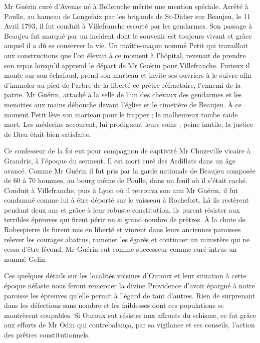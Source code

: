 Mr Guérin curé d'Avenas né à Belleroche mérite une mention spéciale. Arrêté à Poulle, au hameau de Longefaix par les brigands de St-Didier sur Beaujeu, le 11 Avril 1793, il fut conduit à Villefranche escorté par les gendarmes. Son passage à Beaujeu fut marqué par un incident dont le souvenir est toujours vivant et grâce auquel il
a dû se conserver la vie. Un maître-maçon nommé Petit qui travaillait aux constructions que l'on élevait à ce moment à l'hôpital, revenait de prendre son repas lorsqu'il apprend le départ de Mr Guérin pour Villefranche. Furieux il monte sur son échafaud, prend son marteau et invite ses ouvriers à le suivre afin d'immoler au pied de l'arbre de la liberté ce prêtre réfractaire, l'ennemi de la patrie. Mr Guérin, attaché à la selle de l'un des chevaux des gendarmes et les menottes aux mains débouche devant l'église et le cimetière de Beaujeu. À ce moment Petit lève son marteau pour le frapper ; le malheureux tombe raide mort. Les médecins accourent, lui prodiguent leurs soins ; peine inutile, la justice de Dieu était bien satisfaite.

Ce confesseur de la foi eut pour compagnon de captivité Mr Chuzeville vicaire à Grandris, à l'époque du serment. Il est mort curé des Ardillats dans un âge avancé. Comme Mr Guérin il fut pris par la garde nationale de Beaujeu composée de 60 à 70 hommes, au bourg même de Poulle, dans un fenil où il s'était caché. Conduit à Villefranche, puis à Lyon où il retrouva son ami Mr Guérin, il fut condamné comme lui à être déporté sur le vaisseau à Rochefort. Là ils restèrent pendant deux ans et grâce à leur robuste constitution, ils purent résister aux terribles épreuves qui firent périr un si grand nombre de prêtres. À la chute de Robespierre ils furent mis en liberté et vinrent dans leurs anciennes paroisses relever les courages abattus, ramener les égarés et continuer un ministère qui ne cessa d'être fécond. Mr Guérin eut comme successeur comme curé intrus un nommé Gelin.

Ces quelques détails sur les localités voisines d'Ouroux et leur situation à cette époque néfaste nous feront remercier la divine Providence d'avoir épargné à notre paroisse les épreuves qu'elle permit à l'égard de tant d'autres. Rien de surprenant dans les défections sans nombre et les faiblesses dont ces populations se montrèrent coupables. Si Ouroux sut résister aux affronts du schisme, ce fut grâce aux efforts de Mr Odin qui contrebalança, par sa vigilance et ses conseils, l'action des prêtres constitutionnels.
